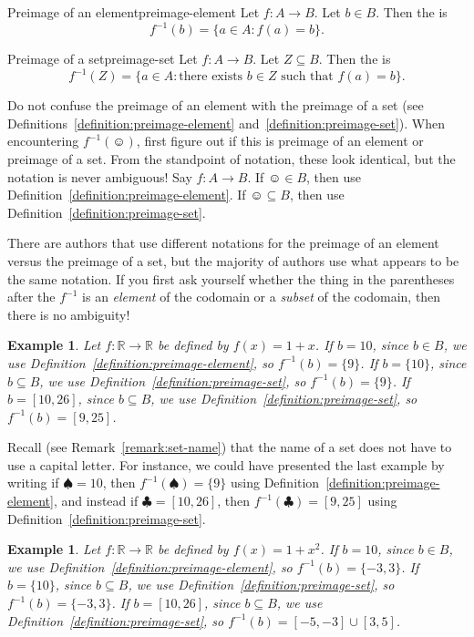 \documentclass{book}
\newcounter{ekcounter}%
\theoremstyle{ekimcustom}
\newtheorem{example}[ekcounter]{Example}
\newcommand\defn[1]{{\color{blue}{\bf #1}}}
\begin{document}

\begin{bdefinition}{Preimage of an element}{preimage-element}
Let $f : A \to B$. Let $b \in B$. Then the \defn{preimage of $b$} is
\[ f^{-1}(b) = \{ a \in A : f(a)=b\}.\]
\end{bdefinition}

\begin{bdefinition}{Preimage of a set}{preimage-set}
Let $f : A \to B$. Let $Z \subseteq B$. Then the \defn{preimage of $Z$} is
\[ f^{-1}(Z) = \{ a \in A : \text{there exists } b \in Z \text{ such that } f(a)=b\}.\]
\end{bdefinition}

\begin{bwarning}{}{}
Do not confuse the preimage of an element with the preimage of a set (see Definitions~\ref{definition:preimage-element} and~\ref{definition:preimage-set}). When encountering $f^{-1}(\smiley)$, first figure out if this is preimage of an element or preimage of a set. From the standpoint of notation, these look identical, but the notation is never ambiguous! Say $f: A \to B$. If $\smiley \in B$, then use Definition~\ref{definition:preimage-element}. If $\smiley \subseteq B$, then use Definition~\ref{definition:preimage-set}.
\end{bwarning}
There are authors that use different notations for the preimage of an element versus the preimage of a set, but the majority of authors use what appears to be the same notation. If you first ask yourself whether the thing in the parentheses after the $f^{-1}$ is an \emph{element} of the codomain or a \emph{subset} of the codomain, then there is no ambiguity!
\begin{example}
Let $f : \mathbb{R} \to \mathbb{R}$ be defined by $f(x) = 1 + x$.
If $b = 10$, since $b \in B$, we use Definition~\ref{definition:preimage-element}, so $f^{-1}(b) = \{9\}$.
If $b = \{10\}$, since $b \subseteq B$, we use Definition~\ref{definition:preimage-set}, so $f^{-1}(b) = \{9\}$.
If $b = [10, 26]$, since $b \subseteq B$, we use Definition~\ref{definition:preimage-set}, so $f^{-1}(b) = [9,25]$.
\end{example}
Recall (see Remark~\ref{remark:set-name}) that the name of a set does not have to use a capital letter. For instance, we could have presented the last example by writing if $\spadesuit = 10$, then $f^{-1}(\spadesuit) = \{9\}$ using Definition~\ref{definition:preimage-element}, and instead if $\clubsuit = [10,26]$, then $f^{-1}(\clubsuit) = [9,25]$ using Definition~\ref{definition:preimage-set}.
\begin{example}
Let $f : \mathbb{R} \to \mathbb{R}$ be defined by $f(x) = 1 + x^2$. 
If $b = 10$, since $b \in B$, we use Definition~\ref{definition:preimage-element}, so $f^{-1}(b) = \{-3,3\}$.
If $b = \{10\}$, since $b \subseteq B$, we use Definition~\ref{definition:preimage-set}, so $f^{-1}(b) = \{-3,3\}$.
If $b = [10, 26]$, since $b \subseteq B$, we use Definition~\ref{definition:preimage-set}, so $f^{-1}(b) = [-5,-3] \cup [3,5]$.
\end{example}
\end{document}
